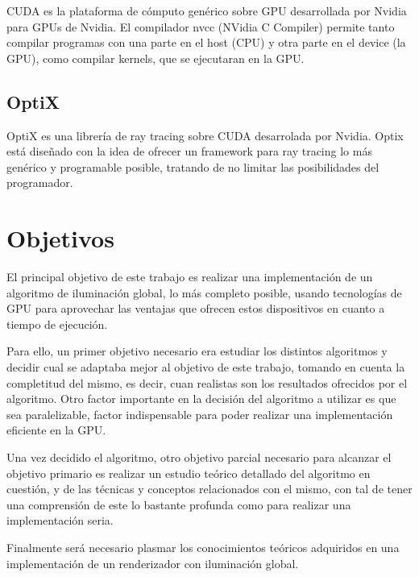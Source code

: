 CUDA es la plataforma de cómputo genérico sobre GPU desarrollada por Nvidia para GPUs de Nvidia. El compilador nvcc (NVidia C Compiler) permite tanto compilar programas con una parte en el host (CPU) y otra parte en el device (la GPU), como compilar kernels, que se ejecutaran en la GPU.

\subsection{OptiX}

OptiX es una librería de ray tracing sobre CUDA desarrolada por Nvidia. Optix está diseñado con la idea de ofrecer un framework para ray tracing lo más genérico y programable posible, tratando de no limitar las posibilidades del programador.

\clearpage

\section{Objetivos}

El principal objetivo de este trabajo es realizar una implementación de un algoritmo de iluminación global, lo más completo posible, usando tecnologías de GPU para aprovechar las ventajas que ofrecen estos dispositivos en cuanto a tiempo de ejecución.

\medskip

Para ello, un primer objetivo necesario era estudiar los distintos algoritmos y decidir cual se adaptaba mejor al objetivo de este trabajo, tomando en cuenta la completitud del mismo, es decir, cuan realistas son los resultados ofrecidos por el algoritmo. Otro factor importante en la decisión del algoritmo a utilizar es que sea paralelizable, factor indispensable para poder realizar una implementación eficiente en la GPU.

\medskip

Una vez decidido el algoritmo, otro objetivo parcial necesario para alcanzar el objetivo primario es realizar un estudio teórico detallado del algoritmo en cuestión, y de las técnicas y conceptos relacionados con el mismo, con tal de tener una comprensión de este lo bastante profunda como para realizar una implementación seria.

\medskip

Finalmente será necesario plasmar los conocimientos teóricos adquiridos en una implementación de un renderizador con iluminación global. 




